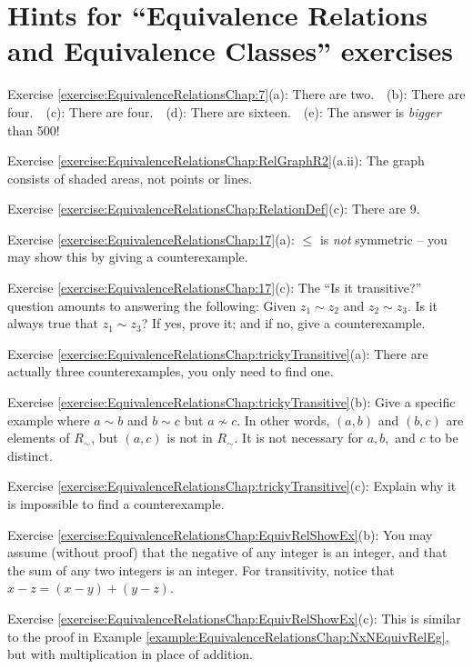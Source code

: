 \section{Hints for ``Equivalence Relations and Equivalence Classes'' exercises}
\label{sec:EquivalenceRelations:Hints} 

\noindent Exercise \ref{exercise:EquivalenceRelationsChap:7}(a): There are two.~~(b): There are four.~~(c): There are four.~~(d): There are sixteen.~~(e): The answer is \emph{bigger} than 500!

\noindent Exercise \ref{exercise:EquivalenceRelationsChap:RelGraphR2}(a.ii): The graph consists of shaded areas, not points or lines.

\noindent Exercise \ref{exercise:EquivalenceRelationsChap:RelationDef}(c): There are 9.

\noindent Exercise \ref{exercise:EquivalenceRelationsChap:17}(a): $\leq$ is \emph{not} symmetric -- you may show this by giving a counterexample.

\noindent Exercise \ref{exercise:EquivalenceRelationsChap:17}(c): The ``Is it transitive?'' question amounts to answering the following:  Given $z_1 \sim z_2$ and $z_2 \sim z_3$.  Is it always true that $z_1 \sim z_3$?  If yes, prove it; and if no, give a counterexample. 

\noindent Exercise \ref{exercise:EquivalenceRelationsChap:trickyTransitive}(a): There are actually three counterexamples, you only need to find one.

\noindent Exercise \ref{exercise:EquivalenceRelationsChap:trickyTransitive}(b): Give a specific example where $a \sim b$ and $b \sim c$ but $a \not\sim c$.  In other words, $(a,b)$ and $(b,c)$ are elements of $R_{\sim}$, but $(a,c)$ is not in  $R_{\sim}$. It is not necessary for $a,b,$ and $c$ to be distinct.

\noindent Exercise \ref{exercise:EquivalenceRelationsChap:trickyTransitive}(c): Explain why it is impossible to find a counterexample.

\noindent Exercise \ref{exercise:EquivalenceRelationsChap:EquivRelShowEx}(b): You may assume (without proof) that the negative of any integer is an integer, and that the sum of any two integers is an integer. For transitivity, notice that $x - z = (x - y) + (y - z)$.

\noindent Exercise \ref{exercise:EquivalenceRelationsChap:EquivRelShowEx}(c): This is similar to the proof in Example \ref{example:EquivalenceRelationsChap:NxNEquivRelEg}, but with multiplication in place of addition.


